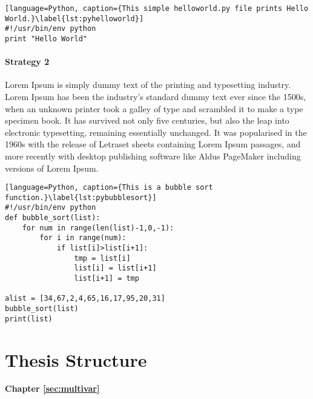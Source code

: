 \begin{lstlisting}[language=Python, caption={This simple helloworld.py file prints Hello World.}\label{lst:pyhelloworld}]
#!/usr/bin/env python
print "Hello World"
\end{lstlisting}

\paragraph{Strategy 2}
Lorem Ipsum is simply dummy text of the printing and typesetting industry. Lorem Ipsum has been the industry's standard dummy text ever since the 1500s, when an unknown printer took a galley of type and scrambled it to make a type specimen book. It has survived not only five centuries, but also the leap into electronic typesetting, remaining essentially unchanged. It was popularised in the 1960s with the release of Letraset sheets containing Lorem Ipsum passages, and more recently with desktop publishing software like Aldus PageMaker including versions of Lorem Ipsum.

\begin{lstlisting}[language=Python, caption={This is a bubble sort function.}\label{lst:pybubblesort}]
#!/usr/bin/env python
def bubble_sort(list):
    for num in range(len(list)-1,0,-1):
        for i in range(num):
            if list[i]>list[i+1]:
                tmp = list[i]
                list[i] = list[i+1]
                list[i+1] = tmp

alist = [34,67,2,4,65,16,17,95,20,31]
bubble_sort(list)
print(list)
\end{lstlisting}

\section{Thesis Structure}
\label{sec:intro:structure}

\textbf{Chapter \ref{sec:multivar}} \\[0.2em]

